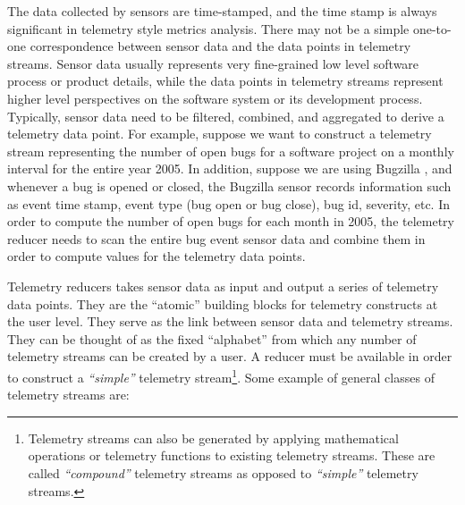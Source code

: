 The data collected by sensors are time-stamped, and the time stamp is always significant in telemetry style metrics analysis. There may not be a simple one-to-one correspondence between sensor data and the data points in telemetry streams. Sensor data usually represents very fine-grained low level software process or product details, while the data points in telemetry streams represent higher level perspectives on the software system or its development process. Typically, sensor data need to be filtered, combined, and aggregated to derive a telemetry data point. 
For example, suppose we want to construct a telemetry stream representing the number of open bugs for a software project on a monthly interval for the entire year 2005. In addition, suppose we are using Bugzilla \cite{Software:Bugzilla}, and whenever a bug is opened or closed, the Bugzilla sensor records information such as event time stamp, event type (bug open or bug close), bug id, severity, etc. In order to compute the number of open bugs for each month in 2005, the telemetry reducer needs to scan the entire bug event sensor data and combine them in order to compute values for the telemetry data points.  
  
Telemetry reducers takes sensor data as input and output a series of telemetry data points. They are the ``atomic'' building blocks for telemetry constructs at the user level. They serve as the link between sensor data and telemetry streams. They can be thought of as the fixed ``alphabet'' from which any number of telemetry streams can be created by a user. A reducer must be available in order to construct a \textit{``simple''} telemetry stream\footnote{Telemetry streams can also be generated by applying mathematical operations or telemetry functions to existing telemetry streams. These are called \textit{``compound''} telemetry streams as opposed to \textit{``simple''} telemetry streams.}. Some example of general classes of telemetry streams are:

